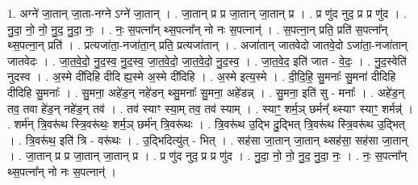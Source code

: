 \documentclass[17pt]{extarticle}
\begin{document}
1. अग्ने॑ जा॒तान् जा॒ता-नग्ने ऽग्ने॑ जा॒तान् । . जा॒तान् प्र प्र जा॒तान् जा॒तान् प्र । . प्र णु॑द नुद॒ प्र प्र णु॑द । . नु॒दा॒ नो॒ नो॒ नु॒द॒ नु॒दा॒ नः॒ । . नः॒ स॒पत्ना᳚न् थ्स॒पत्ना᳚न् नो नः स॒पत्नान्॑ । . स॒पत्ना॒न् प्रति॒ प्रति॑ स॒पत्ना᳚न् थ्स॒पत्ना॒न् प्रति॑ । . प्रत्यजा॑ता॒-नजा॑ता॒न् प्रति॒ प्रत्यजा॑तान् । . अजा॑तान् जातवेदो जातवे॒दो ऽजा॑ता॒-नजा॑तान् जातवेदः । . जा॒त॒वे॒दो॒ नु॒द॒स्व॒ नु॒द॒स्व॒ जा॒त॒वे॒दो॒ जा॒त॒वे॒दो॒ नु॒द॒स्व॒ । . जा॒त॒वे॒द॒ इति॑ जात - वे॒दः॒ । . नु॒द॒स्वेति॑ नुदस्व । . अ॒स्मे दी॑दिहि दीदि ह्य॒स्मे अ॒स्मे दी॑दिहि । . अ॒स्मे इत्य॒स्मे । . दी॒दि॒हि॒ सु॒मनाः᳚ सु॒मना॑ दीदिहि दीदिहि सु॒मनाः᳚ । . सु॒मना॒ अहे॑ड॒न् नहे॑डन् थ्सु॒मनाः᳚ सु॒मना॒ अहे॑डन्न् । . सु॒मना॒ इति॑ सु - मनाः᳚ । . अहे॑ड॒न् तव॒ तवा हे॑ड॒न् नहे॑ड॒न् तव॑ । . तव॑ स्याꣳ स्या॒म् तव॒ तव॑ स्याम् । . स्याꣳ॒॒ शर्म॒ञ् छर्मन्᳚ थ्स्याꣳ स्याꣳ॒॒ शर्मन्न्॑ । . शर्म॑न् त्रि॒वरू॑थ स्त्रि॒वरू॑थः॒ शर्म॒ञ् छर्म॑न् त्रि॒वरू॑थः । . त्रि॒वरू॑थ उ॒द्भि दु॒द्भित् त्रि॒वरू॑थ स्त्रि॒वरू॑थ उ॒द्भित् । . त्रि॒वरू॑थ॒ इति॑ त्रि - वरू॑थः । . उ॒द्भिदित्यु॑त् - भित् । . सह॑सा जा॒तान् जा॒तान् थ्सह॑सा॒ सह॑सा जा॒तान् । . जा॒तान् प्र प्र जा॒तान् जा॒तान् प्र । . प्र णु॑द नुद॒ प्र प्र णु॑द । . नु॒दा॒ नो॒ नो॒ नु॒द॒ नु॒दा॒ नः॒ । . नः॒ स॒पत्ना᳚न् थ्स॒पत्ना᳚न् नो नः स॒पत्नान्॑ । \newline
\end{document}
